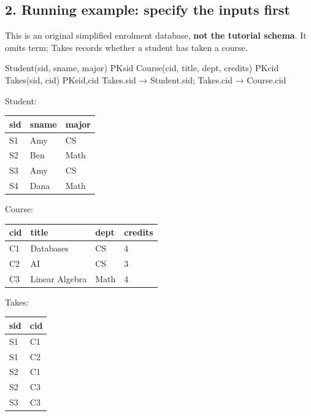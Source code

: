 \subsection{2. Running example: specify the inputs first}\label{05_relational_algebra_en-running-example-specify-the-inputs-first}

This is an original simplified enrolment database, \textbf{not the tutorial schema}. It omits term; Takes records whether a student has taken a course.

\begin{StudyCode}
Student(sid, sname, major)          PK{sid}
Course(cid, title, dept, credits)   PK{cid}
Takes(sid, cid)                    PK{sid,cid}
Takes.sid → Student.sid; Takes.cid → Course.cid
\end{StudyCode}

Student:

\begin{longtable}[]{@{}lll@{}}
\toprule\noalign{}
sid & sname & major \\
\midrule\noalign{}
\endhead
\bottomrule\noalign{}
\endlastfoot
S1 & Amy & CS \\
S2 & Ben & Math \\
S3 & Amy & CS \\
S4 & Dana & Math \\
\end{longtable}

Course:

\begin{longtable}[]{@{}llll@{}}
\toprule\noalign{}
cid & title & dept & credits \\
\midrule\noalign{}
\endhead
\bottomrule\noalign{}
\endlastfoot
C1 & Databases & CS & 4 \\
C2 & AI & CS & 3 \\
C3 & Linear Algebra & Math & 4 \\
\end{longtable}

Takes:

\begin{longtable}[]{@{}ll@{}}
\toprule\noalign{}
sid & cid \\
\midrule\noalign{}
\endhead
\bottomrule\noalign{}
\endlastfoot
S1 & C1 \\
S1 & C2 \\
S2 & C1 \\
S2 & C3 \\
S3 & C3 \\
\end{longtable}

